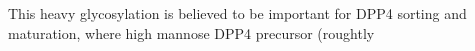 This heavy glycosylation is believed to be important for DPP4 sorting and maturation, where high mannose DPP4 precursor (roughtly \cite{Matter_1991}